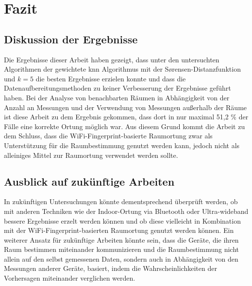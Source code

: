 \chapter{Fazit}

\section{Diskussion der Ergebnisse}

Die Ergebnisse dieser Arbeit haben gezeigt, dass unter den untersuchten Algorithmen der gewichtete \gls{knn} Algorithmus mit der Sørensen-Distanzfunktion und \( k  = 5 \) die besten Ergebnisse erzielen konnte und dass die Datenaufbereitungsmethoden zu keiner Verbesserung der Ergebnisse geführt haben. Bei der Analyse von benachbarten Räumen in Abhängigkeit von der Anzahl an Messungen und der Verwendung von Messungen außerhalb der Räume ist diese Arbeit zu dem Ergebnis gekommen, dass dort in nur maximal 51,2 \% der Fälle eine korrekte Ortung möglich war. Aus diesem Grund kommt die Arbeit zu dem Schluss, dass die WiFi-Fingerprint-basierte Raumortung zwar als Unterstützung für die Raumbestimmung genutzt werden kann, jedoch nicht als alleiniges Mittel zur Raumortung verwendet werden sollte.



\section{Ausblick auf zukünftige Arbeiten}

In zukünftigen Untersuchungen könnte dementsprechend überprüft werden, ob mit anderen Techniken wie der Indoor-Ortung via Bluetooth oder Ultra-wideband bessere Ergebnisse erzelt werden können und ob diese vielleicht in Kombination mit der WiFi-Fingerprint-basierten Raumortung genutzt werden können. Ein weiterer Ansatz für zukünftige Arbeiten könnte sein, dass die Geräte, die ihren Raum bestimmen miteinander kommunizieren und die Raumbestimmung nicht allein auf den selbst gemessenen Daten, sondern auch in Abhängigkeit von den Messungen anderer Geräte, basiert, indem die Wahrscheinlichkeiten der Vorhersagen miteinander verglichen werden.

